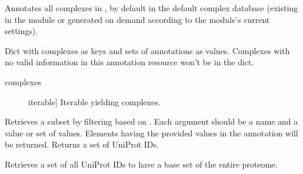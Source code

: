 \documentclass[letterpaper,10pt,english]{sphinxmanual}
\begin{document}
\begin{fulllineitems}
\begin{fulllineitems}
\end{fulllineitems}


\begin{fulllineitems}
\label{\detokenize{reference:pypath.annot.AnnotationBase.complex_inference}}
Annotates all complexes in , by default in the default
complex database (existing in the  module or generated
on demand according to the module’s current settings).

Dict with complexes as keys and sets of annotations as values.
Complexes with no valid information in this annotation resource
won’t be in the dict.
\begin{description}
\item[{complexes}] \leavevmode{[}iterable{]}
Iterable yielding complexes.

\end{description}

\end{fulllineitems}


\begin{fulllineitems}
\label{\detokenize{reference:pypath.annot.AnnotationBase.get_subset}}
Retrieves a subset by filtering based on .
Each argument should be a name and a value or set of values.
Elements having the provided values in the annotation will be
returned.
Returns a set of UniProt IDs.

\end{fulllineitems}


\begin{fulllineitems}
\label{\detokenize{reference:pypath.annot.AnnotationBase.load_proteins}}
Retrieves a set of all UniProt IDs to have a base set of the entire
proteome.


\end{fulllineitems}
\end{fulllineitems}
\end{document}

